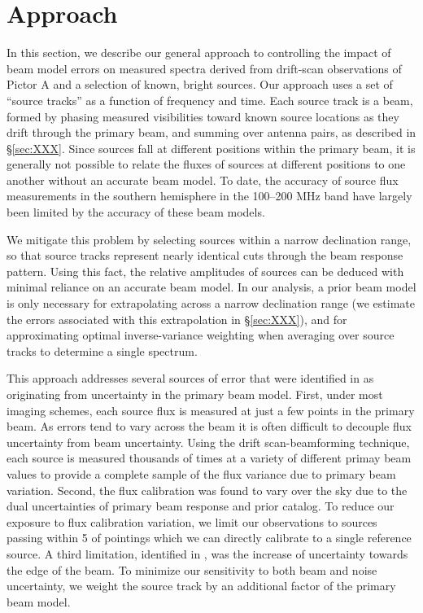 \documentclass[preprint]{aastex}
\begin{document}
\section{Approach}
\label{sec:approach}
In this section, we describe our general approach to controlling the impact of beam model errors on measured
spectra derived from 
drift-scan observations 
of Pictor A and a selection of known, bright sources.  Our approach uses a set of ``source tracks'' as
a function of frequency and time.  Each source track is a beam, formed by phasing measured visibilities toward
known source locations as they drift through the primary beam, and summing over antenna pairs, as
described in \S\ref{sec:XXX}.  Since sources fall
at different positions
within the primary beam, it is generally not possible to relate the fluxes of sources at different positions to
one another without an accurate beam model.  To date, the accuracy of source flux measurements in the
southern hemisphere in the 100--200 MHz band have largely been limited by the accuracy of these beam models.

We mitigate this problem by selecting sources within a narrow declination range, so that source tracks represent
nearly identical cuts through the beam response pattern.  Using this fact, the relative amplitudes of sources
can be deduced with minimal reliance on an accurate beam model.  In our analysis, a prior beam model is only
necessary for extrapolating across a narrow declination range (we estimate the errors associated with this 
extrapolation in \S\ref{sec:XXX}), and for approximating optimal inverse-variance weighting when averaging
over source tracks to determine a single spectrum.

This approach addresses several sources of error that were identified in \citet{Jacobs:2013p9908} 
as originating from uncertainty in the primary beam model.
  First, under most imaging schemes, each source flux is measured at just a few 
points in the primary beam. As errors tend to vary across the beam it is often
 difficult to decouple flux uncertainty from beam uncertainty.
 Using the drift scan-beamforming technique, each 
source is measured thousands of times at a variety of different primay beam values to provide a complete sample of the
flux variance due to primary beam variation.  Second, the flux calibration was found to vary over the 
sky due to the dual uncertainties of primary beam response and prior catalog. To reduce our exposure to flux calibration
variation, we limit our observations to sources passing within 5\arcdeg{}  of pointings which we can directly calibrate
to a single reference source.
 A third limitation, identified in \citet{Williams:2012p8768},
was the increase of uncertainty towards the edge of the beam. To minimize our sensitivity to both beam and noise
uncertainty, we weight the source track by an additional factor of the primary beam model.  
\end{document}
